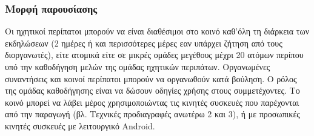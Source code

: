 \subsubsection{Μορφή παρουσίασης}
\label{sec:orge8f1024}

Οι ηχητικοί περίπατοι μπορούν να είναι διαθέσιμοι στο κοινό καθ’όλη τη διάρκεια των εκδηλώσεων (2 ημέρες ή και περισσότερες μέρες εαν υπάρχει ζήτηση από τους διοργανωτές), είτε ατομικά είτε σε μικρές ομάδες μεγέθους μέχρι 20 ατόμων περίπου υπό την καθοδήγηση μελών της ομάδας ηχητικών περιπάτων.  Οργανωμένες συναντήσεις και κοινοί περίπατοι μπορούν να οργανωθούν κατά βούληση.  Ο ρόλος της ομάδας καθοδήγησης είναι να δώσουν οδηγίες χρήσης στους συμμετέχοντες.  Το κοινό μπορεί να λάβει μέρος χρησιμοποιώντας τις κινητές συσκευές που παρέχονται από την παραγωγή (βλ. Τεχνικές προδιαγραφές ανωτέρω 2 και 3), ή με προσωπικές κινητές συσκευές με λειτουργικό Android. 
